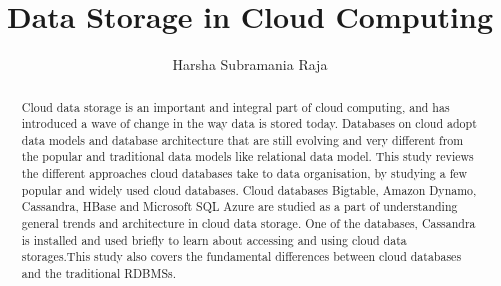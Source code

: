 \documentclass[11pt, a4paper, twoside, openright]{report}
\title{Data Storage in Cloud Computing}
\author{Harsha Subramania Raja}
\begin{document}
\frontmatter

 

\begin{abstract}
\small

 Cloud data storage is an important and integral part of cloud computing, and
 has introduced a wave of change in the way data is stored today. Databases on
 cloud adopt data models and database architecture that are still evolving and
  very different from the popular and traditional data models like relational
  data model. This study reviews the different approaches cloud databases take
  to data organisation, by studying a few popular and widely used cloud
  databases. Cloud databases Bigtable, Amazon Dynamo, Cassandra, HBase and
  Microsoft SQL Azure are studied as a part of understanding general trends and
  architecture in cloud data storage. One of the databases, Cassandra is
  installed and used briefly to learn about accessing and using cloud data
  storages.This     study also covers the fundamental differences between cloud
  databases and the traditional \acp{RDBMS}.

  
\end{abstract}

\maketitle
\onehalfspacing
\tableofcontents

 
\listoftodos



\mainmatter

\acresetall


% 
\acresetall

% 
\acresetall

% 
\acresetall 


\acresetall 

 

\backmatter

\appendix




\end{document}
